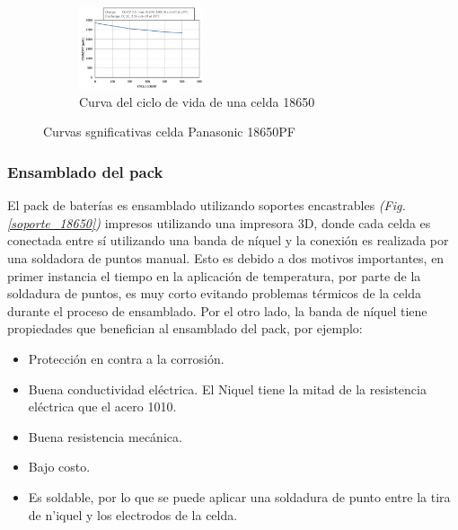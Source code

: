 \documentclass[10pt,a4paper]{article}
\begin{document}
\begin{figure}[h!]
\begin{centering}
	\begin{subfigure}[t]{1\textwidth}
	    \centering
	    \includegraphics[width=0.4\textwidth]{life_cycle_18650.png}
	    \caption{Curva del ciclo de vida de una celda 18650}
        \label{life_cycle_18650}
	\end{subfigure}
    \end{centering}
    \caption{Curvas sgnificativas celda Panasonic 18650PF}
    \label{curvas_sign_18650}
\end{figure}

\newpage

\subsubsection{Ensamblado del pack}

El pack de bater\'ias es ensamblado utilizando soportes encastrables \emph{(Fig.
\ref{soporte_18650})} impresos utilizando una impresora 3D, donde cada celda es
conectada entre s\'i utilizando una banda de níquel y la conexi\'on es realizada 
por una soldadora de puntos manual. Esto es debido a dos motivos importantes, en 
primer instancia el tiempo en la aplicaci\'on de temperatura, por parte de la 
soldadura de puntos, es muy corto evitando problemas t\'ermicos de la celda 
durante el proceso de ensamblado. Por el otro lado, la banda de níquel tiene 
propiedades que benefician al ensamblado del pack, por ejemplo:

\begin{itemize}
    \item Protecci\'on en contra a la corrosi\'on.
    \item Buena conductividad el\'ectrica. El Niquel tiene la mitad de la
        resistencia el\'ectrica que el acero 1010.
    \item Buena resistencia mec\'anica.
    \item Bajo costo.
    \item Es soldable, por lo que se puede aplicar una soldadura de punto entre
        la tira de n'iquel y los electrodos de la celda.
\end{itemize}
\end{document}
